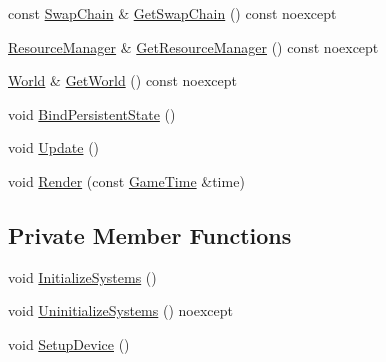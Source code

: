 \begin{DoxyCompactItemize}
\item 
const \hyperlink{classmage_1_1rendering_1_1_swap_chain}{Swap\+Chain} \& \hyperlink{classmage_1_1rendering_1_1_manager_1_1_impl_a7595cf95fc4af88ae359d77fce0681b3}{Get\+Swap\+Chain} () const noexcept
\item 
\hyperlink{classmage_1_1rendering_1_1_resource_manager}{Resource\+Manager} \& \hyperlink{classmage_1_1rendering_1_1_manager_1_1_impl_a604da1cb1bf3eb9783320ee1366c43a4}{Get\+Resource\+Manager} () const noexcept
\item 
\hyperlink{classmage_1_1rendering_1_1_world}{World} \& \hyperlink{classmage_1_1rendering_1_1_manager_1_1_impl_a01dbb540b262170ae3518c9a72945046}{Get\+World} () const noexcept
\item 
void \hyperlink{classmage_1_1rendering_1_1_manager_1_1_impl_a0ffe370f901194395d73f641f72313d6}{Bind\+Persistent\+State} ()
\item 
void \hyperlink{classmage_1_1rendering_1_1_manager_1_1_impl_a8fd123eb4cc188a207ca0bb9824c3f59}{Update} ()
\item 
void \hyperlink{classmage_1_1rendering_1_1_manager_1_1_impl_a65fcce597a9e4066d2dcded9990874e3}{Render} (const \hyperlink{classmage_1_1_game_time}{Game\+Time} \&time)
\end{DoxyCompactItemize}
\subsection*{Private Member Functions}
\begin{DoxyCompactItemize}
\item 
void \hyperlink{classmage_1_1rendering_1_1_manager_1_1_impl_abb9706b54c07c3493ef906667051c336}{Initialize\+Systems} ()
\item 
void \hyperlink{classmage_1_1rendering_1_1_manager_1_1_impl_a0e2979e4330a5148da2fa6cabd19078f}{Uninitialize\+Systems} () noexcept
\item 
void \hyperlink{classmage_1_1rendering_1_1_manager_1_1_impl_ab5685e722d3d8afa96f30955c2d7c8a6}{Setup\+Device} ()
\end{DoxyCompactItemize}
